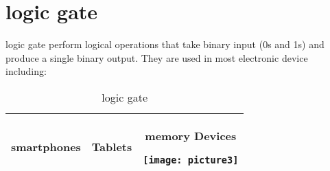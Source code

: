 \documentclass{article}
\begin{document}
	\section{logic gate}
	logic gate perform logical operations that take binary input (0s and 1s) and produce a single binary output. They are used in most electronic device including:
	\begin{table}[h!]
		\begin{center}
			\caption{logic gate}
			\label{tab:table1}
			\begin{tabular}{l|c|c|}
				\hline
				smartphones
				&
				Tablets
				&
				memory Devices
			
				\texttt{[image: picture3]} \\
				
			
				\hline
			\end{tabular}
		\end{center}
	\end{table}
\end{document}
